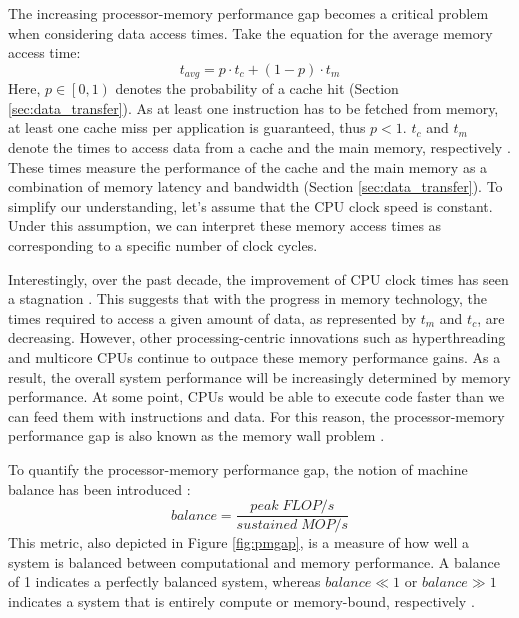 The increasing processor-memory performance gap becomes a critical problem when considering data access times. Take the equation for the average memory access time:
\begin{equation}\label{eq:avg_mem_time}
t_{avg} = p \cdot t_c + (1-p) \cdot t_m
\end{equation}
Here, $p \in \left[0,1\right)$ denotes the probability of a cache hit (Section \ref{sec:data_transfer}). As at least one instruction has to be fetched from memory, at least one cache miss per application is guaranteed, thus $p < 1$. $t_c$ and $t_m$ denote the times to access data from a cache and the main memory, respectively \cite{wulf1995hitting, mahapatra1999processor}. These times measure the performance of the cache and the main memory as a combination of memory latency and bandwidth (Section \ref{sec:data_transfer}). To simplify our understanding, let's assume that the CPU clock speed is constant. Under this assumption, we can interpret these memory access times as corresponding to a specific number of clock cycles.

Interestingly, over the past decade, the improvement of CPU clock times has seen a stagnation \cite{sutter2005free}. This suggests that with the progress in memory technology, the times required to access a given amount of data, as represented by $t_m$ and $t_c$, are decreasing. However, other processing-centric innovations such as hyperthreading and multicore CPUs \cite{sutter2005free} continue to outpace these memory performance gains. As a result, the overall system performance will be increasingly determined by memory performance. At some point, CPUs would be able to execute code faster than we can feed them with instructions and data. For this reason, the processor-memory performance gap is also known as the memory wall problem \cite{wulf1995hitting, mckee2004reflections, mahapatra1999processor}.

To quantify the processor-memory performance gap, the notion of machine balance has been introduced \cite{mccalpin1997survey, mccalpin2016memory}:
\begin{equation}\label{eq:machine_balance}
	balance = \frac{peak\; FLOP/s}{sustained\; MOP/s}
\end{equation}
This metric, also depicted in Figure \ref{fig:pmgap}, is a measure of how well a system is balanced between computational and memory performance. A balance of 1 indicates a perfectly balanced system, whereas $balance \ll 1$ or $balance \gg 1$  indicates a system that is entirely compute or memory-bound, respectively \cite{mccalpin1997survey, mccalpin2016memory}.

